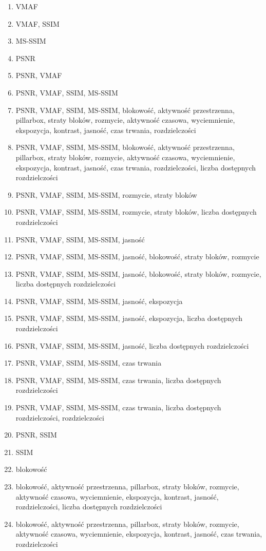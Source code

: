 \begin{enumerate}
\itemsep-0.5em 
\item VMAF
\item VMAF, SSIM
\item MS-SSIM
\item PSNR
\item PSNR, VMAF
\item PSNR, VMAF, SSIM, MS-SSIM
\item PSNR, VMAF, SSIM, MS-SSIM, blokowość, aktywność przestrzenna, pillarbox, straty bloków, rozmycie, aktywność czasowa, wyciemnienie, ekspozycja, kontrast, jasność, czas trwania, rozdzielczości
\item PSNR, VMAF, SSIM, MS-SSIM, blokowość, aktywność przestrzenna, pillarbox, straty bloków, rozmycie, aktywność czasowa, wyciemnienie, ekspozycja, kontrast, jasność, czas trwania, rozdzielczości, liczba dostępnych rozdzielczości
\item PSNR, VMAF, SSIM, MS-SSIM, rozmycie, straty bloków
\item PSNR, VMAF, SSIM, MS-SSIM, rozmycie, straty bloków, liczba dostępnych rozdzielczości
\item PSNR, VMAF, SSIM, MS-SSIM, jasność
\item PSNR, VMAF, SSIM, MS-SSIM, jasność, blokowość, straty bloków, rozmycie
\item PSNR, VMAF, SSIM, MS-SSIM, jasność, blokowość, straty bloków, rozmycie, liczba dostępnych rozdzielczości
\item PSNR, VMAF, SSIM, MS-SSIM, jasność, ekspozycja
\item PSNR, VMAF, SSIM, MS-SSIM, jasność, ekspozycja, liczba dostępnych rozdzielczości
\item PSNR, VMAF, SSIM, MS-SSIM, jasność, liczba dostępnych rozdzielczości
\item PSNR, VMAF, SSIM, MS-SSIM, czas trwania
\item PSNR, VMAF, SSIM, MS-SSIM, czas trwania, liczba dostępnych rozdzielczości
\item PSNR, VMAF, SSIM, MS-SSIM, czas trwania, liczba dostępnych rozdzielczości, rozdzielczości
\item PSNR, SSIM
\item SSIM
\item blokowość
\item blokowość, aktywność przestrzenna, pillarbox, straty bloków, rozmycie, aktywność czasowa, wyciemnienie, ekspozycja, kontrast, jasność, rozdzielczości, liczba dostępnych rozdzielczości
\item blokowość, aktywność przestrzenna, pillarbox, straty bloków, rozmycie, aktywność czasowa, wyciemnienie, ekspozycja, kontrast, jasność, czas trwania, rozdzielczości

\end{enumerate}
